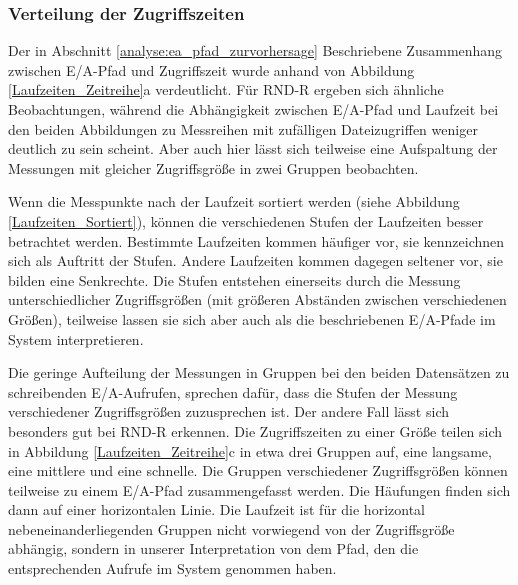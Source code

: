 \documentclass[
	12pt,
	a4paper,
	BCOR10mm,
	DIV14,
	listof=totoc,
	bibliography=totoc,
	headsepline
]{scrreprt}
\begin{document}
\subsubsection{Verteilung der Zugriffszeiten}
Der in Abschnitt \ref{analyse:ea_pfad_zurvorhersage} Beschriebene Zusammenhang zwischen E/A-Pfad und Zugriffszeit wurde anhand von Abbildung \ref{Laufzeiten_Zeitreihe}a verdeutlicht.
Für RND-R ergeben sich ähnliche Beobachtungen, während die Abhängigkeit zwischen E/A-Pfad und Laufzeit bei den beiden Abbildungen zu Messreihen mit zufälligen Dateizugriffen weniger deutlich zu sein scheint. Aber auch hier lässt sich teilweise eine Aufspaltung der Messungen mit gleicher Zugriffsgröße in zwei Gruppen beobachten.\medskip

Wenn die Messpunkte nach der Laufzeit sortiert werden (siehe Abbildung \ref{Laufzeiten_Sortiert}), können die verschiedenen Stufen der Laufzeiten besser betrachtet werden.
Bestimmte Laufzeiten kommen häufiger vor, sie kennzeichnen sich als Auftritt der Stufen. Andere Laufzeiten kommen dagegen seltener vor, sie bilden eine Senkrechte.
Die Stufen entstehen einerseits durch die Messung unterschiedlicher Zugriffsgrößen (mit größeren Abständen zwischen verschiedenen Größen), teilweise lassen sie sich aber auch als die beschriebenen E/A-Pfade im System interpretieren.\medskip

Die geringe Aufteilung der Messungen in Gruppen bei den beiden Datensätzen zu schreibenden E/A-Aufrufen, sprechen dafür, dass die Stufen der Messung verschiedener Zugriffsgrößen zuzusprechen ist.
Der andere Fall lässt sich besonders gut bei RND-R erkennen. Die Zugriffszeiten zu einer Größe teilen sich in Abbildung \ref{Laufzeiten_Zeitreihe}c in etwa drei Gruppen auf, eine langsame, eine mittlere und eine schnelle.
Die Gruppen verschiedener Zugriffsgrößen können teilweise zu einem E/A-Pfad zusammengefasst werden. Die Häufungen finden sich dann auf einer horizontalen Linie. 
Die Laufzeit ist für die horizontal nebeneinanderliegenden Gruppen nicht vorwiegend von der Zugriffsgröße abhängig, sondern in unserer Interpretation von dem Pfad, den die entsprechenden Aufrufe im System genommen haben. 
\end{document}
